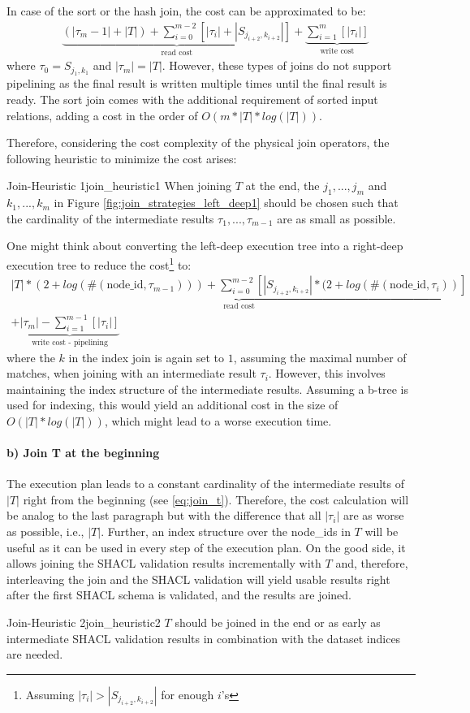 In case of the sort or the hash join, the cost can be approximated to be:
\begin{align*}
    & \underbrace{(|\tau_m-1| + |T|) + \sum_{i=0}^{m-2} \left[|\tau_i| + |S_{j_{i+2},k_{i+2}}|\right]}_{\textrm{read cost}} + \underbrace{\sum_{i=1}^{m} \left[|\tau_i|\right]}_\textrm{write cost}
\end{align*}
where $\tau_0 = S_{j_{1},k_{1}}$ and $|\tau_m| = |T|$.
However, these types of joins do not support pipelining as the final result is written multiple times until the final result is ready. The sort join comes with the additional requirement of sorted input relations, adding a cost in the order of $O(m * |T|*log(|T|))$.

Therefore, considering the cost complexity of the physical join operators, the following heuristic to minimize the cost arises:

\begin{Satz}{Join-Heuristic 1}{join_heuristic1}
When joining $T$ at the end, the $j_1,...,j_m$ and $k_1,...,k_m$ in Figure \ref{fig:join_strategies_left_deep1} should be chosen such that the cardinality of the intermediate results $\tau_1,...,\tau_{m-1}$ are as small as possible.
\end{Satz}

One might think about converting the left-deep execution tree into a right-deep execution tree to reduce the cost\footnote{Assuming $|\tau_i| > |S_{j_{i+2},k_{i+2}}|$ for enough $i$'s} to:
\begin{multline*}
    \underbrace{|T| * (2 + log(\#(\textrm{node\_id}, \tau_{m-1}))) + \sum_{i=0}^{m-2} \left[ |S_{j_{i+2},k_{i+2}}| * (2 + log(\#(\textrm{node\_id}, \tau_i))\right]}_{\textrm{read cost}} \\
    + \underbrace{|\tau_m| - \sum_{i=1}^{m-1} \left[|\tau_i|\right]}_\textrm{write cost - pipelining}
\end{multline*}
where the $k$ in the index join is again set to $1$, assuming the maximal number of matches, when joining with an intermediate result $\tau_i$.
However, this involves maintaining the index structure of the intermediate results. Assuming a b-tree is used for indexing, this would yield an additional cost in the size of $O(|T| * log(|T|))$, which might lead to a worse execution time.

\paragraph{b) Join T at the beginning} The execution plan leads to a constant cardinality of the intermediate results of $|T|$ right from the beginning (see \ref{eq:join_t}).
Therefore, the cost calculation will be analog to the last paragraph but with the difference that all $|\tau_i|$ are as worse as possible, i.e., $|T|$. Further, an index structure over the node\_ids in $T$ will be useful as it can be used in every step of the execution plan. 
On the good side, it allows joining the SHACL validation results incrementally with $T$ and, therefore, interleaving the join and the SHACL validation will yield usable results right after the first SHACL schema is validated, and the results are joined.

\begin{Satz}{Join-Heuristic 2}{join_heuristic2}
$T$ should be joined in the end or as early as intermediate SHACL validation results in combination with the dataset indices are needed.
\end{Satz}